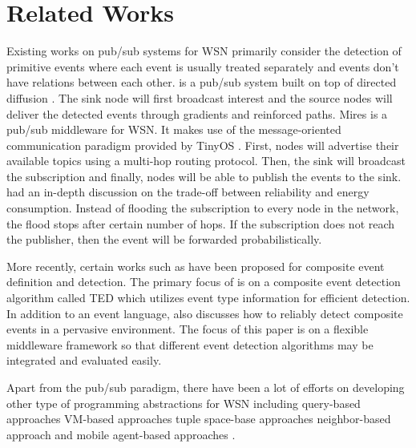 \section{Related Works}
\label{sec:relatedworks}
Existing works on pub/sub systems for WSN primarily consider the detection of primitive events where each event is usually treated separately and events don't have relations between each other. \cite{lowlevelnaming} is a pub/sub system built on top of directed diffusion \cite{directeddiffusion}. The sink node will first broadcast interest and the source nodes will deliver the detected events through gradients and reinforced paths. Mires \cite{mires} is a pub/sub middleware for WSN. It makes use of the message-oriented communication paradigm provided by TinyOS \cite{nesc}. First, nodes will advertise their available topics using a multi-hop routing protocol. Then, the sink will broadcast the subscription and finally, nodes will be able to publish the events to the sink. \cite{sp} had an in-depth discussion on the trade-off between reliability and energy consumption. Instead of flooding the subscription to every node in the network, the flood stops after certain number of hops. If the subscription does not reach the publisher, then the event will be forwarded probabilistically. 

More recently, certain works such as \cite{lai:ted, complexevent} have been proposed for composite event definition and detection. The primary focus of \cite{lai:ted} is on a composite event detection algorithm called TED which utilizes event type information for efficient detection. In addition to an event language, \cite{complexevent} also discusses how to reliably detect composite events in a pervasive environment. The focus of this paper is on a flexible middleware framework so that different event detection algorithms may be integrated and evaluated easily.

Apart from the pub/sub paradigm, there have been a lot of efforts on developing other type of programming abstractions for WSN including query-based approaches \cite{cougar, sina, tinydb} VM-based approaches \cite{magnetos, mate, smartmessage} tuple space-base approaches \cite{tinylime} neighbor-based approach \cite{kairos, hood, abstractregion} and mobile agent-based approaches \cite{agilla, sensorware}.

